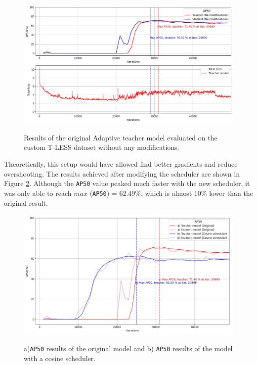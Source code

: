 \begin{figure}[htb]
	\begin{center}
		\includegraphics[width=16cm]{./loss&AP50_original.jpg}
	\end{center}
	\caption{Results of the original Adaptive teacher model evaluated on the custom T-LESS dataset without any modifications.}
	\begin{center}
		\label{original_experiment}
	\end{center}
\end{figure}
\FloatBarrier
Theoretically, this setup would have allowed find better gradients and reduce overshooting. The results achieved after modifying the scheduler are shown in Figure \ref{comparison_1}. Although the \texttt{AP50} value peaked much faster with the new scheduler, it was only able to reach $max$ (\texttt{AP50}) = 62.49\%, which is almost 10\% lower than the original result.   



\begin{figure}[htb]
	\begin{center}
		\includegraphics[width=14cm]{./AP50_scheduler.jpg}
	\end{center}
	\caption{a)\texttt{AP50} results of the original model and b) \texttt{AP50} results of the model with a cosine scheduler.}
	\begin{center}
		\label{comparison_1}
	\end{center}
\end{figure}
\FloatBarrier

